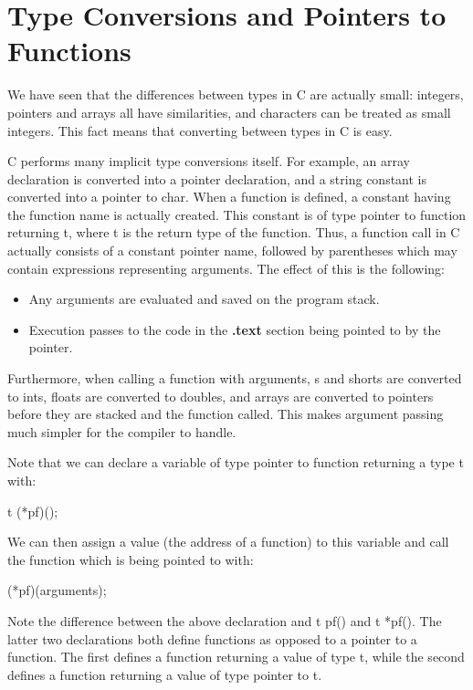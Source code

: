 
\section{Type Conversions and Pointers to Functions}

     We have  seen that the differences between types in C are
actually small:  integers, pointers  and arrays  all have
similarities, and  characters can be treated as  small integers. This
fact means that converting between types in C is easy.

     C performs  many implicit  type conversions itself. For example,
an array declaration is  converted into a pointer declaration, and a
string constant is converted into  a pointer  to {\cd char}.  When a
function is defined, a  constant having the function name is actually
created. This constant is of type {\ms pointer to function returning 
t\/}, where  {\ms t\/} is  the return  type of  the function. Thus, a
function   call  in  C  actually  consists  of  a constant pointer name, 
followed  by parentheses which  may contain expressions representing
arguments. The effect of this is the following:
 \begin{itemize}
\item Any arguments are evaluated and saved on the program stack.

\item Execution  passes to  the code  in the  {\bf .text} section
    being pointed to by the pointer.
\end{itemize}
     Furthermore, when calling a function with arguments, 
s
and {\cd short}s are converted to  {\cd int}s, {\cd float}s  are
converted to {\cd double}s, and arrays are converted to pointers
before they  are stacked  and the  function  called.  This  makes
argument passing much simpler for the compiler to handle.

Note that we can declare a variable of type {\ms pointer to function 
returning a type t} with:
 \begin{code}
t    (*pf)();
\end{code}
\noindent
     We can then assign a value (the address of a function) to this 
variable and call the function which is being pointed to with:
\begin{code}
(*pf)({\ms arguments\/});
\end{code}
\noindent
Note the difference between the above declaration and {\cd t pf()}
and {\cd t *pf()}.  The latter two declarations both define functions
as opposed to a pointer to a function.  The first defines a function
returning a value of type {\cd t}, while the second defines a function
returning a value of type {\ms pointer to\/} {\cd t}.

